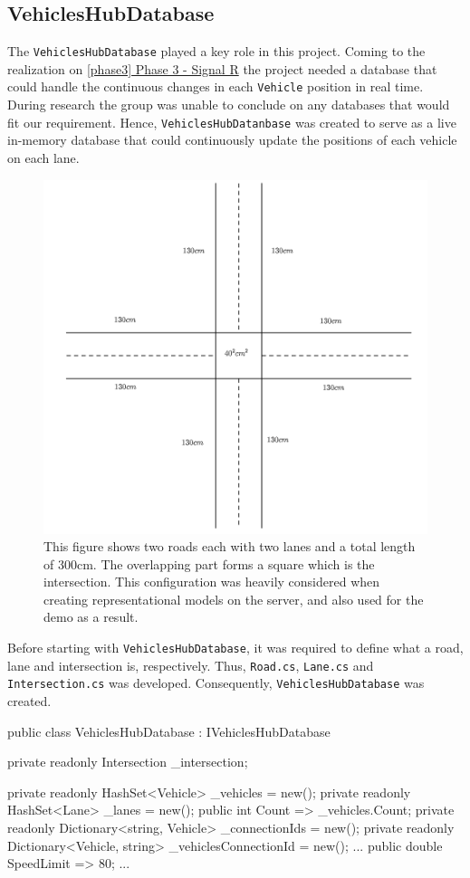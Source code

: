 \subsection{VehiclesHubDatabase}
The \verb|VehiclesHubDatabase| played a key role in this project. Coming to the realization on \hyperref[phase3]{\ref{phase3} Phase 3 - Signal R} the project needed a database that could handle the continuous changes in each \verb|Vehicle| position in real time. During research the group was unable to conclude on any databases that would fit our requirement. Hence, \verb|VehiclesHubDatanbase| was created to serve as a live in-memory database that could continuously update the positions of each vehicle on each lane.
\begin{figure}[h!]
	\centering
	\includegraphics[width=1\linewidth]{figures/intersection_concept}
	\caption{This figure shows two roads each with two lanes and a total length of 300cm. The overlapping part forms a square which is the intersection. This configuration was heavily considered when creating representational models on the server, and also used for the demo as a result.}
	\label{fig:intersectionconcept}
\end{figure}

Before starting with \verb|VehiclesHubDatabase|, it was required to define what a road, lane and intersection is, respectively. Thus, \verb|Road.cs|, \verb|Lane.cs| and \verb|Intersection.cs| was developed. Consequently, \verb|VehiclesHubDatabase| was created.
\begin{csharp}
public class VehiclesHubDatabase : IVehiclesHubDatabase
{
	private readonly Intersection _intersection;
	
	private readonly HashSet<Vehicle> _vehicles = new();
	private readonly HashSet<Lane> _lanes = new();
	public int Count => _vehicles.Count;
	private readonly Dictionary<string, Vehicle> _connectionIds = new();
	private readonly Dictionary<Vehicle, string> _vehiclesConnectionId = new();
	...
	public double SpeedLimit => 80;
	...
}
\end{csharp}

